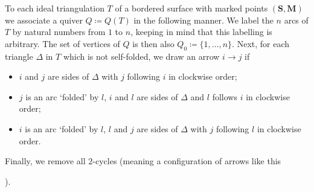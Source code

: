 \documentclass[a4paper,oneside,svgnames]{amsart}
\theoremstyle{plain}
\theoremstyle{definition}
\begin{document}
 To each ideal triangulation $T$ of a bordered surface with marked points
 $(\mathbf{S},\mathbf{M})$ we associate a quiver $Q \coloneqq Q(T)$ in the
 following manner. We label the $n$ arcs of $T$ by natural numbers from $1$ to
 $n$, keeping in mind that this labelling is arbitrary. The set of vertices of
 $Q$ is then also $Q_0 \coloneqq \{1,\ldots,n\}$. Next, for each triangle
 $\Delta$ in $T$ which is not self-folded, we draw an arrow $i \to j$ if
 \begin{itemize}
  \item $i$ and $j$ are sides of $\Delta$ with $j$ following $i$ in clockwise
   order;
  \item $j$ is an arc `folded' by $l$, $i$ and $l$ are sides of $\Delta$ and $l$
   follows $i$ in clockwise order;
  \item $i$ is an arc `folded' by $l$, $l$ and $j$ are sides of $\Delta$ with
   $j$ following $l$ in clockwise order.
 \end{itemize}
 Finally, we remove all $2$-cycles (meaning a configuration of arrows like this
 ).
\end{document}
